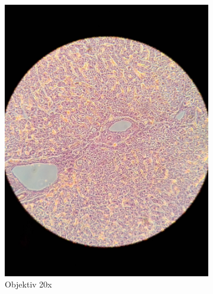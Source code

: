 \begin{figure}[h!]
\begin{subfigure}[b]{0.3\textwidth}
		\includegraphics[width=1\textwidth]{../images/04_human_liver.jpg}
		\caption{Objektiv 20x}
		\label{fig:04_human_liver}
	\end{subfigure}
	\begin{subfigure}[b]{0.3\textwidth}

\end{subfigure}
\end{figure}
